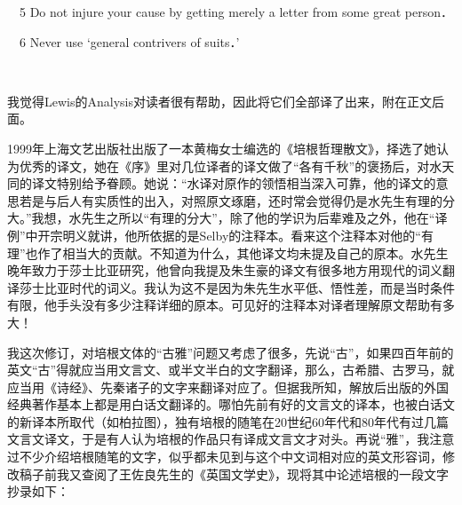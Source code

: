 \par 　5 Do not injure your cause by getting merely a letter from some great person．
\par 　6 Never use ‘general contrivers of suits．’
\par  
\par 我觉得Lewis的Analysis对读者很有帮助，因此将它们全部译了出来，附在正文后面。
\par 1999年上海文艺出版社出版了一本黄梅女士编选的《培根哲理散文》，择选了她认为优秀的译文，她在《序》里对几位译者的译文做了“各有千秋”的褒扬后，对水天同的译文特别给予眷顾。她说：“水译对原作的领悟相当深入可靠，他的译文的意思若是与后人有实质性的出入，对照原文琢磨，还时常会觉得仍是水先生有理的分大。”我想，水先生之所以“有理的分大”，除了他的学识为后辈难及之外，他在“译例”中开宗明义就讲，他所依据的是Selby的注释本。看来这个注释本对他的“有理”也作了相当大的贡献。不知道为什么，其他译文均未提及自己的原本。水先生晚年致力于莎士比亚研究，他曾向我提及朱生豪的译文有很多地方用现代的词义翻译莎士比亚时代的词义。我认为这不是因为朱先生水平低、悟性差，而是当时条件有限，他手头没有多少注释详细的原本。可见好的注释本对译者理解原文帮助有多大！
\par 我这次修订，对培根文体的“古雅”问题又考虑了很多，先说“古”，如果四百年前的英文“古”得就应当用文言文、或半文半白的文字翻译，那么，古希腊、古罗马，就应当用《诗经》、先秦诸子的文字来翻译对应了。但据我所知，解放后出版的外国经典著作基本上都是用白话文翻译的。哪怕先前有好的文言文的译本，也被白话文的新译本所取代（如柏拉图），独有培根的随笔在20世纪60年代和80年代有过几篇文言文译文，于是有人认为培根的作品只有译成文言文才对头。再说“雅”，我注意过不少介绍培根随笔的文字，似乎都未见到与这个中文词相对应的英文形容词，修改稿子前我又查阅了王佐良先生的《英国文学史》，现将其中论述培根的一段文字抄录如下：
